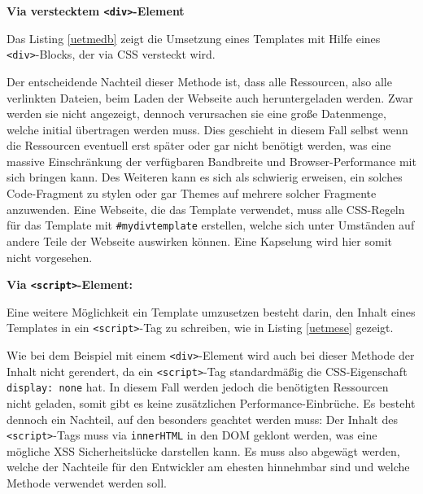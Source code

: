 \textbf{Via verstecktem \texttt{\textless{}div\textgreater{}}-Element}

Das Listing \ref{uetmedb} zeigt die Umsetzung eines Templates mit Hilfe eines \texttt{\textless{}div\textgreater{}}-Blocks, der via \ac{CSS} versteckt wird.



Der entscheidende Nachteil dieser Methode ist, dass alle Ressourcen, also alle verlinkten Dateien, beim Laden der Webseite auch heruntergeladen werden. Zwar werden sie nicht angezeigt, dennoch verursachen sie eine große Datenmenge, welche initial übertragen werden muss. Dies geschieht in diesem Fall selbst wenn die Ressourcen eventuell erst später oder gar nicht benötigt werden, was eine massive Einschränkung der verfügbaren Bandbreite und Browser-Performance mit sich bringen kann. Des Weiteren kann es sich als schwierig erweisen, ein solches Code-Fragment zu stylen oder gar Themes auf mehrere solcher Fragmente anzuwenden. Eine Webseite, die das Template verwendet, muss alle \ac{CSS}-Regeln für das Template mit \texttt{\#mydivtemplate} erstellen, welche sich unter Umständen auf andere Teile der Webseite auswirken können. Eine Kapselung wird hier somit nicht vorgesehen.

\textbf{Via \texttt{\textless{}script\textgreater{}}-Element:}

Eine weitere Möglichkeit ein Template umzusetzen besteht darin, den Inhalt eines Templates in ein \texttt{\textless{}script\textgreater{}}-Tag zu schreiben, wie in Listing \ref{uetmese} gezeigt.



Wie bei dem Beispiel mit einem \texttt{\textless{}div\textgreater{}}-Element wird auch bei dieser Methode der Inhalt nicht gerendert, da ein \texttt{\textless{}script\textgreater{}}-Tag standardmäßig die \ac{CSS}-Eigenschaft \texttt{display:\ none} hat. In diesem Fall werden jedoch die benötigten Ressourcen nicht geladen, somit gibt es keine zusätzlichen Performance-Einbrüche. Es besteht dennoch ein Nachteil, auf den besonders geachtet werden muss: Der Inhalt des \texttt{\textless{}script\textgreater{}}-Tags muss via \texttt{innerHTML} in den \ac{DOM} geklont werden, was eine mögliche \ac{XSS} Sicherheitslücke darstellen kann. Es muss also abgewägt werden, welche der Nachteile für den Entwickler am ehesten hinnehmbar sind und welche Methode verwendet werden soll.



